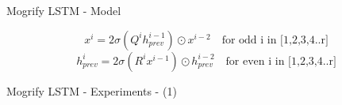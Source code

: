 \documentclass[10pt]{beamer}
\begin{document}
\begin{frame}{Mogrify LSTM - Model}

    \begin{figure}
        \begin{center}
            $$ x^i = 2 \sigma(Q^i h_{prev}^{i-1}) \odot x^{i - 2} \quad \text{for odd i in  [1,2,3,4..r]} $$
            $$ h^i_{prev} = 2 \sigma(R^i x^{i-1}) \odot h_{prev}^{i - 2}  \quad  \text{for even i in  [1,2,3,4..r]} $$

        \end{center}
    \end{figure}

\end{frame}

\begin{frame}{Mogrify LSTM - Experiments - (1)}

    \begin{figure}
        \begin{center}
        \end{center}
    \end{figure}
\end{frame}
\end{document}
